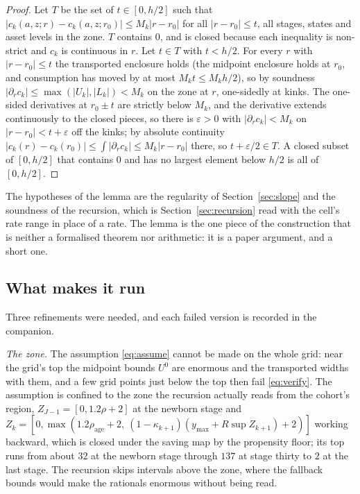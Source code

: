 \documentclass[11pt]{article}
\theoremstyle{definition}
\theoremstyle{remark}
\begin{document}
\begin{proof}
Let $T$ be the set of $t\in[0,h/2]$ such that $|c_k(a,z;r)-c_k(a,z;r_0)|\le M_k|r-r_0|$ for all
$|r-r_0|\le t$, all stages, states and asset levels in the zone. $T$ contains $0$, and is closed
because each inequality is non-strict and $c_k$ is continuous in $r$. Let $t\in T$ with $t<h/2$. For
every $r$ with $|r-r_0|\le t$ the transported enclosure holds (the midpoint enclosure holds at
$r_0$, and consumption has moved by at most $M_kt\le M_kh/2$), so by soundness
$|\partial_rc_k|\le\max(|U_k|,|L_k|)<M_k$ on the zone at $r$, one-sidedly at kinks. The one-sided
derivatives at $r_0\pm t$ are strictly below $M_k$, and the derivative extends continuously to the
closed pieces, so there is $\varepsilon>0$ with $|\partial_rc_k|<M_k$ on
$|r-r_0|<t+\varepsilon$ off the kinks; by absolute continuity
$|c_k(r)-c_k(r_0)|\le\int|\partial_rc_k|\le M_k|r-r_0|$ there, so $t+\varepsilon/2\in T$. A closed
subset of $[0,h/2]$ that contains $0$ and has no largest element below $h/2$ is all of $[0,h/2]$.
\end{proof}

The hypotheses of the lemma are the regularity of Section~\ref{sec:slope} and the soundness of the
recursion, which is Section~\ref{sec:recursion} read with the cell's rate range in place of a rate.
The lemma is the one piece of the construction that is neither a formalised theorem nor arithmetic:
it is a paper argument, and a short one.

\subsection{What makes it run}

Three refinements were needed, and each failed version is recorded in the companion.

\emph{The zone.} The assumption \eqref{eq:assume} cannot be made on the whole grid: near the grid's
top the midpoint bounds $U^0$ are enormous and the transported widths with them, and a few grid
points just below the top then fail \eqref{eq:verify}. The assumption is confined to the zone the
recursion actually reads from the cohort's region, $Z_{J-1}=[0,1.2\rho+2]$ at the newborn stage and
$Z_k=[0,\max(1.2\rho_{\mathrm{age}}+2,\ (1-\kappa_{k+1})(y_{\max}+R\sup Z_{k+1})+2)]$ working
backward, which is closed under the saving map by the propensity floor; its top runs from about
$32$ at the newborn stage through $137$ at stage thirty to $2$ at the last stage. The recursion
skips intervals above the zone, where the fallback bounds would make the rationals enormous without
being read.
\end{document}
